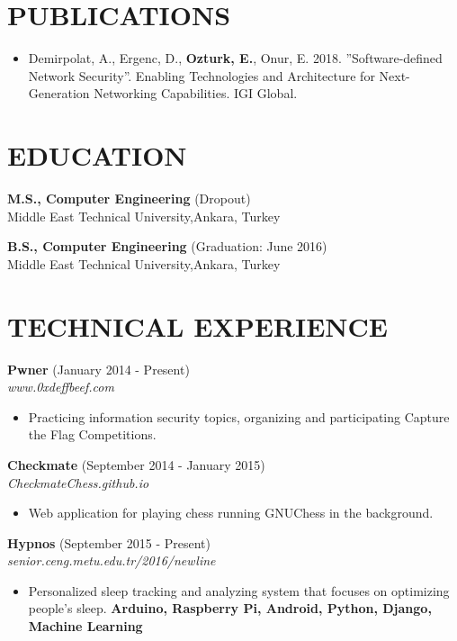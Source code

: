 \documentclass[margin, 10pt]{res} %
\begin{document}
\begin{resume}
        \section{PUBLICATIONS}
        \begin{itemize}
        		\item  Demirpolat, A., Ergenc, D., {\bf Ozturk, E.}, Onur, E. 2018. ”Software-defined Network Security”. Enabling Technologies and Architecture for Next-Generation Networking Capabilities. IGI Global.

        \end{itemize}
        


        \section{EDUCATION}

        {\bf M.S., Computer Engineering } \hfill {(Dropout)}\\
        Middle East Technical University,Ankara, Turkey

        {\bf B.S., Computer Engineering } \hfill {(Graduation: June 2016)}\\
        Middle East Technical University,Ankara, Turkey


        \section{TECHNICAL EXPERIENCE}

        {\bf Pwner} \hfill (January 2014 - Present) \\
        \textit{www.0xdeffbeef.com}
        \begin{itemize}
            \item Practicing information security topics, organizing and participating Capture the Flag Competitions.
        \end{itemize}

        {\bf Checkmate} \hfill (September 2014 - January 2015) \\
        \textit{CheckmateChess.github.io}
        \begin{itemize}
            \item Web application for playing chess running GNUChess in the background.
        \end{itemize}

       

        {\bf Hypnos} \hfill (September 2015 - Present) \\
        \textit{senior.ceng.metu.edu.tr/2016/newline}
        \begin{itemize}
            \item Personalized sleep tracking and analyzing system that focuses on optimizing people's sleep. {\bf Arduino, Raspberry Pi, Android, Python, Django, Machine Learning }
        \end{itemize}



\end{resume}
\end{document}
